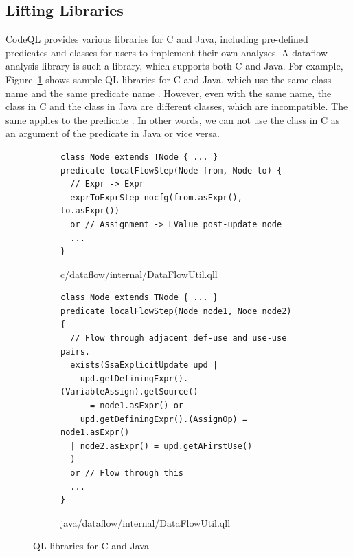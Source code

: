 
\subsection{Lifting Libraries}

CodeQL provides various libraries for C and Java, including
pre-defined predicates and classes for users to implement their own analyses.
A dataflow analysis library is such a library, which supports both C and Java.
For example, Figure~\ref{fig:qll} shows sample QL libraries for C and Java,
which use the same class name  and the same predicate
name .
However, even with the same name, the class  in C and the
class  in Java are different classes, which are incompatible.
The same applies to the predicate .
In other words, we can not use the class  in C as an
argument of the predicate  in Java or vice versa.

\begin{figure}[t]
  \centering
  \begin{subfigure}[t]{0.5\textwidth}
\begin{lstlisting}[style=codeql,xleftmargin=2.5em]
class Node extends TNode { ... }
predicate localFlowStep(Node from, Node to) {
  // Expr -> Expr
  exprToExprStep_nocfg(from.asExpr(), to.asExpr())
  or // Assignment -> LValue post-update node
  ...
}
\end{lstlisting}
    \vspace*{-.5em}
    \caption{c/dataflow/internal/DataFlowUtil.qll}
  \end{subfigure}
  \begin{subfigure}[t]{0.5\textwidth}
\begin{lstlisting}[style=codeql,xleftmargin=2.5em]
class Node extends TNode { ... }
predicate localFlowStep(Node node1, Node node2) {
  // Flow through adjacent def-use and use-use pairs.
  exists(SsaExplicitUpdate upd |
    upd.getDefiningExpr().(VariableAssign).getSource()
      = node1.asExpr() or
    upd.getDefiningExpr().(AssignOp) = node1.asExpr()
  | node2.asExpr() = upd.getAFirstUse()
  )
  or // Flow through this
  ...
}
\end{lstlisting}
    \vspace*{-.5em}
    \caption{java/dataflow/internal/DataFlowUtil.qll}
  \end{subfigure}
  \vspace*{-.5em}
  \caption{QL libraries for C and Java}
  \label{fig:qll}
\end{figure}

